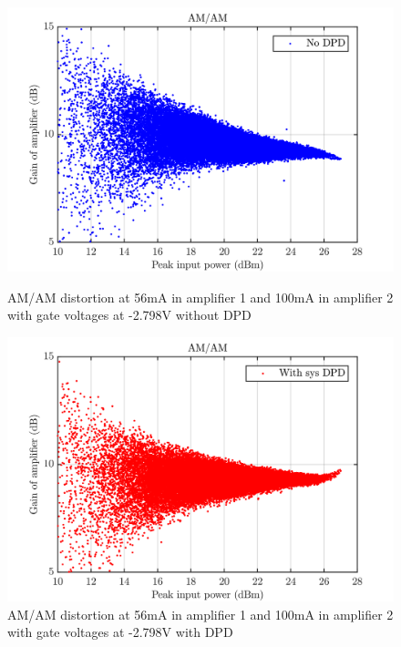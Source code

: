 \begin{figure}[H]
  \centering
  \begin{minipage}[b]{0.5\textwidth}
	\includegraphics[scale = 0.5]{figures/measurement/cree/meas5/amam_no_dpd_2p798v.png}
	\caption{AM/AM distortion at 56mA in amplifier 1 and 100mA in amplifier 2 with gate voltages at -2.798V without DPD}	
    \label{fig:meas5_1}
  \end{minipage}
  \hfill
  \begin{minipage}[b]{0.4\textwidth}
	\includegraphics[scale = 0.5]{figures/measurement/cree/meas5/amam_sys_dpd_2p798v.png}
	\caption{AM/AM distortion at 56mA in amplifier 1 and 100mA in amplifier 2 with gate voltages at -2.798V with DPD}
    \label{fig:meas5_1}
  \end{minipage}
\end{figure}
 
